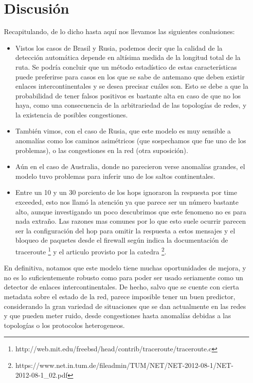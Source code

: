 \section{Discusión}

Recapitulando, de lo dicho hasta aquí nos llevamos las siguientes conlusiones:

\begin{itemize}
	\item Vistos los casos de Brasil y Rusia, podemos decir que la calidad de la detección automática depende en altísima medida de la longitud total de la ruta. Se podría concluir que un método estadístico de estas características puede preferirse para casos en los que se sabe de antemano que deben existir enlaces intercontinentales y se desea precisar cuáles son. Esto se debe a que la probabilidad de tener falsos positivos es bastante alta en caso de que no los haya, como una consecuencia de la arbitrariedad de las topologías de redes, y la existencia de posibles congestiones.
	\item También vimos, con el caso de Rusia, que este modelo es muy sensible a anomalías como los caminos asimétricos (que sospechamos que fue uno de los problemas), o las congestiones en la red (otra suposición).
	\item Aún en el caso de Australia, donde no parecieron verse anomalías grandes, el modelo tuvo problemas para inferir uno de los saltos continentales.
	\item Entre un 10 y un 30 porciento de los hops ignoraron la respuesta por time exceeded, esto nos llamó la atención ya que parece ser un número bastante alto, aunque investigando un poco descubrimos que este fenomeno no es para nada extraño. Las razones mas comunes por lo que esto suele ocurrir parecen ser la configuración del hop para omitir la respuesta a estos mensajes y el bloqueo de paquetes desde el firewall según indica la documentación de traceroute \footnote{http://web.mit.edu/freebsd/head/contrib/traceroute/traceroute.c} y el articulo provisto por la catedra \footnote{https://www.net.in.tum.de/fileadmin/TUM/NET/NET-2012-08-1/NET-2012-08-1\_02.pdf}.

\end{itemize}

En definitiva, notamos que este modelo tiene muchas oportunidades de mejora, y no es lo suficientemente robusto como para poder ser usado seriamente como un detector de enlaces intercontinentales. De hecho, salvo que se cuente con cierta metadata sobre el estado de la red, parece imposible tener un buen predictor, considerando la gran variedad de situaciones que se dan actualmente en las redes y que pueden meter ruido, desde congestiones hasta anomalías debidas a las topologías o los protocolos heterogeneos.
